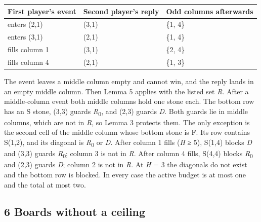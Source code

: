 \documentclass[
  a4paper,
]{article}
\newcounter{none} %
\begin{document}
{\def\LTcaptype{none} %
\begin{longtable}[]{@{}
  >{\raggedright\arraybackslash}p{}
  >{\raggedright\arraybackslash}p{}
  >{\raggedright\arraybackslash}p{}@{}}
\toprule\noalign{}
\begin{minipage}[b]{\linewidth}\raggedright
First player's event
\end{minipage} & \begin{minipage}[b]{\linewidth}\raggedright
Second player's reply
\end{minipage} & \begin{minipage}[b]{\linewidth}\raggedright
Odd columns afterwards
\end{minipage} \\
\midrule\noalign{}
\endhead
\bottomrule\noalign{}
\endlastfoot
enters (2,1) & (3,1) & \{1, 4\} \\
enters (3,1) & (2,1) & \{1, 4\} \\
fills column 1 & (3,1) & \{2, 4\} \\
fills column 4 & (2,1) & \{1, 3\} \\
\end{longtable}
}

The event leaves a middle column empty and cannot win, and the reply
lands in an empty middle column. Then Lemma 5 applies with the listed
set \emph{R}. After a middle-column event both middle columns hold one
stone each. The bottom row has an S stone, (3,3) guards
\emph{R}\textsubscript{0}, and (2,3) guards \emph{D}. Both guards lie in
middle columns, which are not in \emph{R}, so Lemma 3 protects them. The
only exception is the second cell of the middle column whose bottom
stone is F. Its row contains S(1,2), and its diagonal is
\emph{R}\textsubscript{0} or \emph{D}. After column 1 fills (\emph{H} ≥
5), S(1,4) blocks \emph{D} and (3,3) guards \emph{R}\textsubscript{0};
column 3 is not in \emph{R}. After column 4 fills, S(4,4) blocks
\emph{R}\textsubscript{0} and (2,3) guards \emph{D}; column 2 is not in
\emph{R}. At \emph{H} = 3 the diagonals do not exist and the bottom row
is blocked. In every case the active budget is at most one and the total
at most two.

\subsection{6 Boards without a ceiling}\label{boards-without-a-ceiling}
\end{document}
